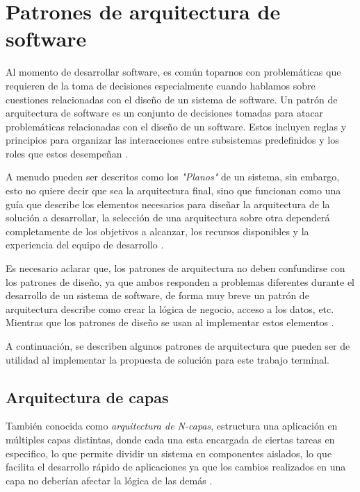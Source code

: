 
\section{Patrones de arquitectura de software}
Al momento de desarrollar software, es común toparnos con problemáticas que requieren de la toma de decisiones especialmente cuando hablamos sobre cuestiones relacionadas con el diseño de un sistema de software.
Un patrón de arquitectura de software es un conjunto de decisiones tomadas para atacar problemáticas relacionadas con el diseño de un software. Estos incluyen reglas y principios para organizar las interacciones entre subsistemas predefinidos y los roles que estos desempeñan \cite{L07}.

A menudo pueden ser descritos como los \textit{"Planos"} de un sistema, sin embargo, esto no quiere decir que sea la arquitectura final, sino que funcionan como una guía que describe los elementos necesarios para diseñar la arquitectura de la solución a desarrollar, la selección de una arquitectura sobre otra dependerá completamente de los objetivos a alcanzar, los recursos disponibles y la experiencia del equipo de desarrollo \cite{L08}.

Es necesario aclarar que, los patrones de arquitectura no deben confundirse con los patrones de diseño, ya que ambos responden a problemas diferentes durante el desarrollo de un sistema de software, de forma muy breve un patrón de arquitectura describe como crear la lógica de negocio, acceso a los datos, etc. Mientras que los patrones de diseño se usan al implementar estos elementos \cite{L07}.

A continuación, se describen algunos patrones de arquitectura que pueden ser de utilidad al implementar la propuesta de solución para este trabajo terminal.	

\subsection{Arquitectura de capas}

También conocida como \textit{arquitectura de N-capas}, estructura una aplicación en múltiples capas distintas, donde cada una esta encargada de ciertas tareas en especifico, lo que permite dividir un sistema en componentes aislados, lo que facilita el desarrollo rápido de aplicaciones ya que los cambios realizados en una capa no deberían afectar la lógica de las demás \cite{L09}.

